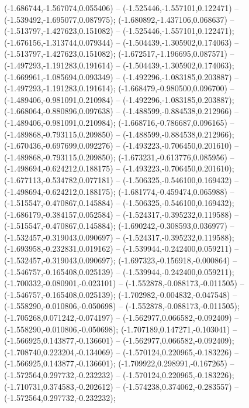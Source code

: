  (-1.686744,-1.567074,0.055406) -- (-1.525446,-1.557101,0.122471) -- (-1.539492,-1.695077,0.087975);
 (-1.680892,-1.437106,0.068637) -- (-1.513797,-1.427623,0.151082) -- (-1.525446,-1.557101,0.122471);
 (-1.676156,-1.313744,0.079344) -- (-1.504439,-1.305902,0.174063) -- (-1.513797,-1.427623,0.151082);
 (-1.672517,-1.196695,0.087571) -- (-1.497293,-1.191283,0.191614) -- (-1.504439,-1.305902,0.174063);
 (-1.669961,-1.085694,0.093349) -- (-1.492296,-1.083185,0.203887) -- (-1.497293,-1.191283,0.191614);
 (-1.668479,-0.980500,0.096700) -- (-1.489406,-0.981091,0.210984) -- (-1.492296,-1.083185,0.203887);
 (-1.668064,-0.880896,0.097638) -- (-1.488599,-0.884538,0.212966) -- (-1.489406,-0.981091,0.210984);
 (-1.668716,-0.786687,0.096165) -- (-1.489868,-0.793115,0.209850) -- (-1.488599,-0.884538,0.212966);
 (-1.670436,-0.697699,0.092276) -- (-1.493223,-0.706450,0.201610) -- (-1.489868,-0.793115,0.209850);
 (-1.673231,-0.613776,0.085956) -- (-1.498694,-0.624212,0.188175) -- (-1.493223,-0.706450,0.201610);
 (-1.677113,-0.534782,0.077181) -- (-1.506325,-0.546100,0.169432) -- (-1.498694,-0.624212,0.188175);
 (-1.681774,-0.459474,0.065988) -- (-1.515547,-0.470867,0.145884) -- (-1.506325,-0.546100,0.169432);
 (-1.686179,-0.384157,0.052584) -- (-1.524317,-0.395232,0.119588) -- (-1.515547,-0.470867,0.145884);
 (-1.690242,-0.308593,0.036977) -- (-1.532457,-0.319043,0.090697) -- (-1.524317,-0.395232,0.119588);
 (-1.693958,-0.232831,0.019162) -- (-1.539944,-0.242400,0.059211) -- (-1.532457,-0.319043,0.090697);
 (-1.697323,-0.156918,-0.000864) -- (-1.546757,-0.165408,0.025139) -- (-1.539944,-0.242400,0.059211);
 (-1.700332,-0.080901,-0.023101) -- (-1.552878,-0.088173,-0.011505) -- (-1.546757,-0.165408,0.025139);
 (-1.702982,-0.004832,-0.047548) -- (-1.558290,-0.010806,-0.050698) -- (-1.552878,-0.088173,-0.011505);
 (-1.705268,0.071242,-0.074197) -- (-1.562977,0.066582,-0.092409) -- (-1.558290,-0.010806,-0.050698);
 (-1.707189,0.147271,-0.103041) -- (-1.566925,0.143877,-0.136601) -- (-1.562977,0.066582,-0.092409);
 (-1.708740,0.223204,-0.134069) -- (-1.570124,0.220965,-0.183226) -- (-1.566925,0.143877,-0.136601);
 (-1.709922,0.298991,-0.167265) -- (-1.572564,0.297732,-0.232232) -- (-1.570124,0.220965,-0.183226);
 (-1.710731,0.374583,-0.202612) -- (-1.574238,0.374062,-0.283557) -- (-1.572564,0.297732,-0.232232);
